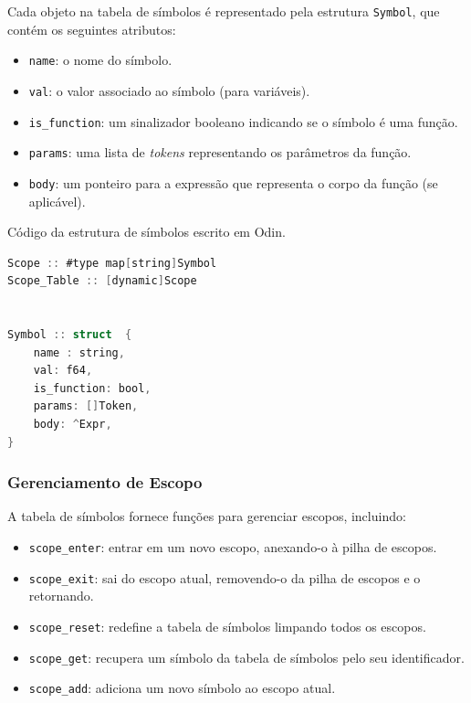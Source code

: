 \documentclass[english, 
               brazil, 
               bsc] %
               {dcomp-abntex2}
\begin{document}
Cada objeto na tabela de símbolos é representado pela estrutura \texttt{Symbol}, que contém os seguintes atributos:
\begin{itemize}
    \item \texttt{name}: o nome do símbolo.
    \item \texttt{val}: o valor associado ao símbolo (para variáveis).
    \item \texttt{is\_function}: um sinalizador booleano indicando se o símbolo é uma função.
    \item \texttt{params}: uma lista de \textit{tokens} representando os parâmetros da função.
    \item \texttt{body}: um ponteiro para a expressão que representa o corpo da função (se aplicável).
\end{itemize}




\begin{codigo}[htb]
\caption{\small Código da estrutura de símbolos escrito em Odin.}
\label{struct-symbol}
\begin{lstlisting}[language=C]
Scope :: #type map[string]Symbol
Scope_Table :: [dynamic]Scope


Symbol :: struct  {
    name : string,
    val: f64,
    is_function: bool,
    params: []Token,
    body: ^Expr,
}

\end{lstlisting}
\end{codigo}


\subsubsection{Gerenciamento de Escopo}

A tabela de símbolos fornece funções para gerenciar escopos, incluindo:
\begin{itemize}
    \item \texttt{scope\_enter}: entrar em um novo escopo, anexando-o à pilha de escopos.
    \item \texttt{scope\_exit}: sai do escopo atual, removendo-o da pilha de escopos e o retornando.
    \item \texttt{scope\_reset}: redefine a tabela de símbolos limpando todos os escopos.
    \item \texttt{scope\_get}: recupera um símbolo da tabela de símbolos pelo seu identificador.
    \item \texttt{scope\_add}: adiciona um novo símbolo ao escopo atual.
\end{itemize}
\end{document}
